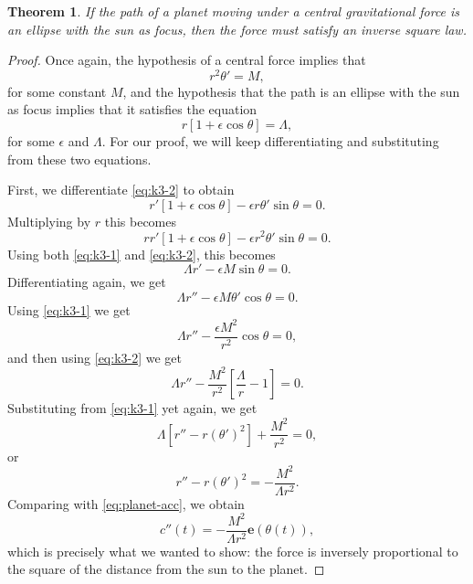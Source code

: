 \documentclass{article}
\newtheorem{theorem}{Theorem}
\begin{document}
\begin{theorem}
  If the path of a planet moving under a central gravitational force is an
  ellipse with the sun as focus, then the force must satisfy an inverse square
  law.
\end{theorem}
\begin{proof}
  Once again, the hypothesis of a central force implies that
  \begin{equation} \label{eq:k3-1} \tag{$K_2$}
    r^2\theta' = M,
  \end{equation} for some constant $M$, and the hypothesis that the path is an
  ellipse with the sun as focus implies that it satisfies the equation
  \begin{equation} \label{eq:k3-2} \tag{A}
    r[1 + \epsilon \cos \theta] = \Lambda,
  \end{equation} for some $\epsilon$ and $\Lambda$. For our proof, we will keep
  differentiating and substituting from these two equations.

  First, we differentiate \eqref{eq:k3-2} to obtain \[
    r'[1 + \epsilon \cos \theta] - \epsilon r \theta' \sin \theta = 0.
  \] Multiplying by $r$ this becomes \[
    rr'[1 + \epsilon \cos \theta] - \epsilon r^2 \theta' \sin \theta = 0.
  \] Using both \eqref{eq:k3-1} and \eqref{eq:k3-2}, this becomes \[
    \Lambda r' - \epsilon M \sin \theta = 0.
  \] Differentiating again, we get \[
    \Lambda r'' - \epsilon M \theta' \cos \theta = 0.
  \] Using \eqref{eq:k3-1} we get \[
    \Lambda r'' - \frac{\epsilon M^2}{r^2} \cos \theta = 0,
  \] and then using \eqref{eq:k3-2} we get \[
    \Lambda r'' - \frac{M^2}{r^2}\left[\frac{\Lambda}{r} - 1\right] = 0.
  \] Substituting from \eqref{eq:k3-1} yet again, we get \[
    \Lambda[r'' - r(\theta')^2] + \frac{M^2}{r^2} = 0,
  \] or \[
    r'' - r(\theta')^2 = -\frac{M^2}{\Lambda r^2}.
  \] Comparing with \eqref{eq:planet-acc}, we obtain \[
    c''(t) = -\frac{M^2}{\Lambda r^2} \mathbf{e}(\theta(t)),
  \] which is precisely what we wanted to show: the force is inversely
  proportional to the square of the distance from the sun to the planet.
\end{proof}
\end{document}
